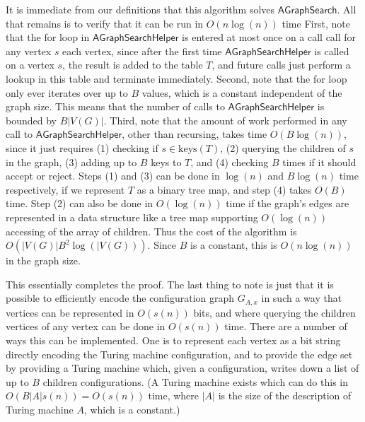 \documentclass{article}
\begin{document}
It is immediate from our definitions that this algorithm solves $\mathsf{AGraphSearch}$.  All that remains is to verify that it can be run in $O(n \log(n))$ time
First, note that the for loop in $\mathsf{AGraphSearchHelper}$ is entered at most once on a call call for any vertex $s$ each vertex, since after the first time $\mathsf{AGraphSearchHelper}$ is called on a vertex $s$, the result is added to the table $T$, and future calls just perform a lookup in this table and terminate immediately.
Second, note that the for loop only ever iterates over up to $B$ values, which is a constant independent of the graph size.
This means that the number of calls to $\mathsf{AGraphSearchHelper}$ is bounded by $B |V(G)|$.
Third, note that the amount of work performed in any call to $\mathsf{AGraphSearchHelper}$, other than recursing, takes time $O(B \log(n))$, since it just requires (1) checking if $s \in \text{keys}(T)$, (2) querying the children of $s$ in the graph,
(3) adding up to $B$ keys to $T$, and
(4) checking $B$ times if it should accept or reject.
Steps (1) and (3) can be done in $\log(n)$ and $B \log(n)$ time respectively, if we represent $T$ as a binary tree map, and step (4) takes $O(B)$ time.
Step (2) can also be done in $O(\log(n))$ time if the graph's edges are represented in a data structure like a tree map supporting $O(\log(n))$ accessing of the array of children.
Thus the cost of the algorithm is $O(|V(G)|B^2 \log(|V(G)))$.  Since $B$ is a constant,
this is $O(n \log(n))$ in the graph size.

This essentially completes the proof.
The last thing to note is just that it is possible to efficiently encode the configuration graph $G_{A, x}$ in such a way that vertices can be represented in $O(s(n))$ bits, and where querying the children vertices of any vertex can be done in $O(s(n))$ time.
There are a number of ways this can be implemented.
One is to represent each vertex as a bit string directly encoding the Turing machine configuration, and to provide the edge set by providing a Turing machine which, given a configuration, writes down a list of up to $B$ children configurations.
(A Turing machine exists which can do this in $O(B |A| s(n)) = O(s(n))$ time, where $|A|$ is the size of the description of Turing machine $A$, which is a constant.)

\end{document}
